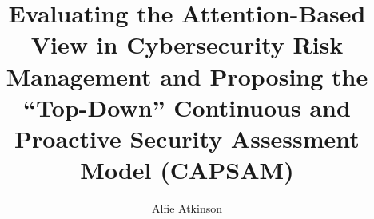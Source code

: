 \author{Alfie Atkinson}

\title{\bfseries\Large Evaluating the Attention-Based View in Cybersecurity Risk Management and Proposing the ``Top-Down'' Continuous and Proactive Security Assessment Model (CAPSAM)}


